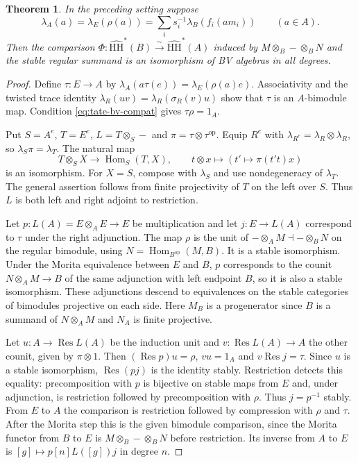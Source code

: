 \documentclass[12pt,a4paper,english,reqno]{amsart}
\numberwithin{equation}{section}
\theoremstyle{plain}
\newtheorem{theorem}{Theorem}[section]
\theoremstyle{definition}
\begin{document}
\begin{theorem}\label{thm:tate-bv-compatible}
In the preceding setting suppose
\begin{equation}\label{eq:tate-bv-compat}
 \lambda_A(a)=\lambda_E(\rho(a))
     =\sum_i s_i^{-1}\lambda_B(f_i(a m_i))\qquad(a\in A).
\end{equation}
Then the comparison $\Phi:\widehat{\mathrm{HH}}^*(B)
 \xrightarrow{\sim}\widehat{\mathrm{HH}}^*(A)$ induced by
$M\otimes_B-\otimes_BN$ and the stable regular summand is
an isomorphism of BV algebras in all degrees.
\end{theorem}

\begin{proof}
Define $\tau:E\to A$ by
$\lambda_A(a\tau(e))=\lambda_E(\rho(a)e)$.
Associativity and the twisted trace identity
$\lambda_R(uv)=\lambda_R(\sigma_R(v)u)$ show that $\tau$
is an $A$-bimodule map. Condition \eqref{eq:tate-bv-compat}
gives $\tau\rho=1_A$.

Put $S=A^e$, $T=E^e$, $L=T\otimes_S-$ and
$\pi=\tau\otimes\tau^{\mathrm{op}}$. Equip $R^e$ with
$\lambda_{R^e}=\lambda_R\otimes\lambda_R$, so
$\lambda_S\pi=\lambda_T$. The natural map
\[
 T\otimes_S X\longrightarrow\operatorname{Hom}_S(T,X),
 \qquad t\otimes x\longmapsto(t'\mapsto\pi(t't)x)
\]
is an isomorphism. For $X=S$, compose with $\lambda_S$ and use
nondegeneracy of $\lambda_T$. The general assertion follows
from finite projectivity of $T$ on the left over $S$.
Thus $L$ is both left and right adjoint to restriction.

Let $p:L(A)=E\otimes_A E\to E$ be multiplication and let
$j:E\to L(A)$ correspond to $\tau$ under the right adjunction.
The map $\rho$ is the unit of $-\otimes_A M\dashv-\otimes_B N$
on the regular bimodule, using $N=\operatorname{Hom}_{B^{\mathrm{op}}}(M,B)$.
It is a stable isomorphism. Under the Morita equivalence between
$E$ and $B$, $p$ corresponds to the counit $N\otimes_A M\to B$
of the same adjunction with left endpoint $B$, so it is also a
stable isomorphism. These adjunctions descend to equivalences
on the stable categories of bimodules projective on each side.
Here $M_B$ is a progenerator since $B$ is a summand of
$N\otimes_A M$ and $N_A$ is finite projective.

Let $u:A\to\operatorname{Res}L(A)$ be the induction unit and
$v:\operatorname{Res}L(A)\to A$ the other counit, given by
$\pi\otimes1$. Then $(\operatorname{Res}p)u=\rho$,
$vu=1_A$ and $v\operatorname{Res}j=\tau$.
Since $u$ is a stable isomorphism, $\operatorname{Res}(pj)$
is the identity stably. Restriction detects this equality:
precomposition with $p$ is bijective on stable maps from $E$
and, under adjunction, is restriction followed by precomposition
with $\rho$. Thus $j=p^{-1}$ stably. From $E$ to $A$ the
comparison is restriction followed by compression with $\rho$
and $\tau$. After the Morita step this is the given bimodule
comparison, since the Morita functor from $B$ to $E$ is
$M\otimes_B-\otimes_B N$ before restriction. Its inverse
from $A$ to $E$ is $[g]\mapsto p[n]L([g])j$ in degree $n$.


\end{proof}
\end{document}
